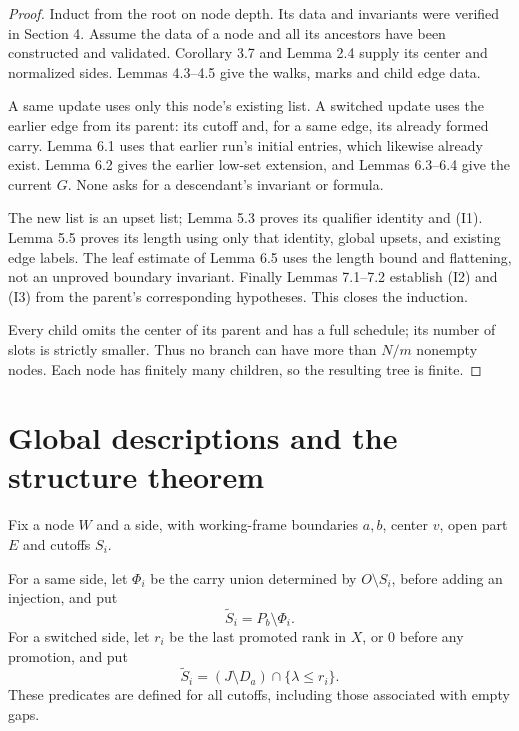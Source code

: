 \begin{proof}
Induct from the root on node depth. Its data and invariants were verified in Section 4. Assume the data of a node and all its ancestors have been constructed and validated. Corollary 3.7 and Lemma 2.4 supply its center and normalized sides. Lemmas 4.3--4.5 give the walks, marks and child edge data.

A same update uses only this node's existing list. A switched update uses the earlier edge from its parent: its cutoff and, for a same edge, its already formed carry. Lemma 6.1 uses that earlier run's initial entries, which likewise already exist. Lemma 6.2 gives the earlier low-set extension, and Lemmas 6.3--6.4 give the current \(G\). None asks for a descendant's invariant or formula.

The new list is an upset list; Lemma 5.3 proves its qualifier identity and (I1). Lemma 5.5 proves its length using only that identity, global upsets, and existing edge labels. The leaf estimate of Lemma 6.5 uses the length bound and flattening, not an unproved boundary invariant. Finally Lemmas 7.1--7.2 establish (I2) and (I3) from the parent's corresponding hypotheses. This closes the induction.

Every child omits the center of its parent and has a full schedule; its number of slots is strictly smaller. Thus no branch can have more than \(N/m\) nonempty nodes. Each node has finitely many children, so the resulting tree is finite.
\end{proof}

\section{Global descriptions and the structure theorem}

Fix a node \(W\) and a side, with working-frame boundaries \(a,b\), center \(v\), open part \(E\) and cutoffs \(S_i\).

For a same side, let \(\Phi_i\) be the carry union determined by \(O\setminus S_i\), before adding an injection, and put \[
\widetilde S_i=P_b\setminus\Phi_i.
\tag{8.1}
\] For a switched side, let \(r_i\) be the last promoted rank in \(X\), or \(0\) before any promotion, and put \[
\widetilde S_i=(J\setminus D_a)\cap\{\lambda\leq r_i\}.
\tag{8.2}
\] These predicates are defined for all cutoffs, including those associated with empty gaps.

